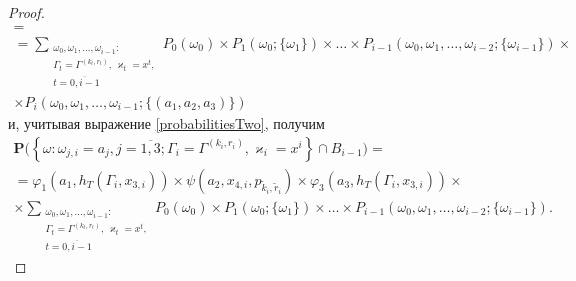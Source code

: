 \documentclass[12pt]{extarticle}
\theoremstyle{theorem}
\theoremstyle{remark}
\renewcommand{\Pr}{{\mathbf P}}
\begin{document}
\begin{proof}
\begin{multline*}
= \\ =\sum_{\substack{\omega_0, \omega_1,\ldots, \omega_{i-1} \colon \\ \Gamma_t=\Gamma^{(k_t,r_t)},\, \varkappa_t=x^t, \\ t=\overline{0,i-1}}} P_0(\omega_0)\times P_1(\omega_0;\{\omega_1\})\times\ldots \times P_{i-1}(\omega_0,\omega_1,\ldots, \omega_{i-2};\{\omega_{i-1}\})
\times \\[-2ex] \times P_i(\omega_0,\omega_1,\ldots, \omega_{i-1};\{(a_1, a_2, a_3)\})
\end{multline*}
и, учитывая выражение \eqref{probabilitiesTwo}, получим
\begin{multline}
\Pr\bigl( \left\{ \omega \colon \omega_{j,i} = a_j, j=\overline{1,3}; \Gamma_i=\Gamma^{(k_i,r_i)}, \varkappa_i=x^i\right\} \cap B_{i-1}\bigr) 
=\\=\varphi_1(a_1,h_T(\Gamma_i,x_{3,i})) \times \psi(a_2,x_{4,i}, p_{\tilde{k}_i,\tilde{r}_i}) \times  \varphi_3(a_3,h_T(\Gamma_i,x_{3,i}))
\times \\ \times \sum_{\substack{\omega_0, \omega_1,\ldots, \omega_{i-1} \colon \\ \Gamma_t=\Gamma^{(k_t,r_t)},\, \varkappa_t=x^t,\\ t=\overline{0,i-1}}} P_0(\omega_0)\times P_1(\omega_0;\{\omega_1\})\times \ldots \times P_{i-1}(\omega_0,\omega_1,\ldots, \omega_{i-2};\{\omega_{i-1}\}).
\label{Construction:4}
\end{multline}


\end{proof}
\end{document}
